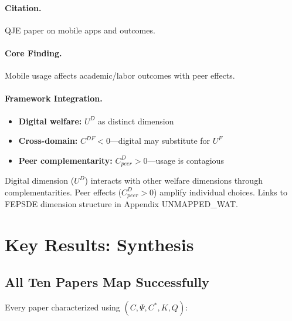 \paragraph{Citation.}
QJE paper on mobile apps and outcomes.

\paragraph{Core Finding.}
Mobile usage affects academic/labor outcomes with peer effects.

\paragraph{Framework Integration.}
\begin{itemize}
  \item \textbf{Digital welfare:} $U^D$ as distinct dimension
  \item \textbf{Cross-domain:} $C^{DF} < 0$---digital may substitute for $U^F$
  \item \textbf{Peer complementarity:} $C^{D}_{peer} > 0$---usage is contagious
\end{itemize}

\begin{tcolorbox}[colback=yellow!5!white, colframe=yellow!75!black,
    title=EBF Insight: Digital Behavior]
Digital dimension ($U^D$) interacts with other welfare dimensions through
complementarities. Peer effects ($C^D_{peer} > 0$) amplify individual choices.
Links to FEPSDE dimension structure in Appendix UNMAPPED_WAT.
\end{tcolorbox}


\section{Key Results: Synthesis}
\label{sec:J-results}

\subsection{All Ten Papers Map Successfully}

Every paper characterized using $(C, \Psi, C^*, K, Q)$:


